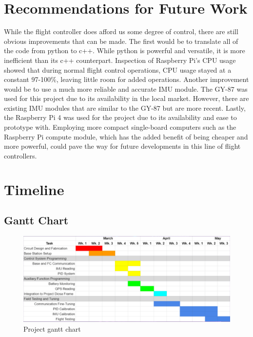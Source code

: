 \documentclass[english]{upeeei}
\begin{document}
\chapter{Recommendations for Future Work}
While the flight controller does afford us some degree of control, there are still obvious improvements that can be made. The first would be to
translate all of the code from python to c++. While python is powerful and versatile, it is more inefficient than its c++ counterpart. Inspection
of Raspberry Pi's CPU usage showed that during normal flight control operations, CPU usage stayed at a constant 97-100\%, leaving little room for
added operations. Another improvement would be to use a much more reliable and accurate IMU module. The GY-87 was used for this project due to its
availability in the local market. However, there are existing IMU modules that are similar to the GY-87 but are more recent. Lastly, the Raspberry Pi 4
was used for the project due to its availability and ease to prototype with. Employing more compact single-board computers such as the Raspberry Pi
compute module, which has the added benefit of being cheaper and more powerful, could pave the way for future developments in this line of flight controllers.

\chapter{Timeline}
\section{Gantt Chart}
\begin{figure}[h]
    \centering
    \includegraphics[scale=0.6]{images/gantt_chart.PNG}
    \caption{Project gantt chart}
    \label{fig:gantt_chart}
\end{figure}

\printbibliography[
heading=bibintoc,
title={Bibliography}
]
\end{document}
